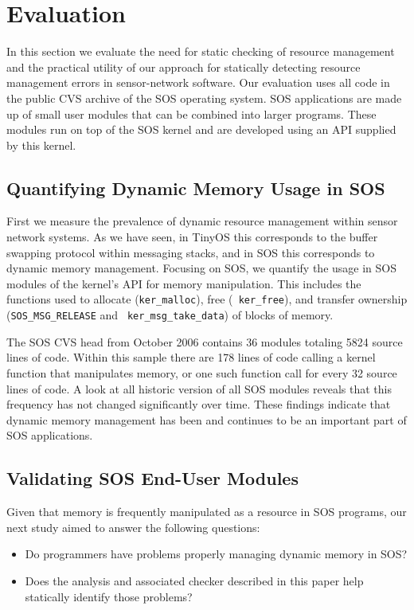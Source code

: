 \section{Evaluation}
\label{sec:eval}

In this section we evaluate the need for static checking of resource
management and the practical utility of our
approach for statically detecting resource management errors in
sensor-network software.  Our evaluation uses all code in the
public CVS archive of the SOS operating system.
SOS applications are made up of small
user modules that can be combined into larger programs.  These modules
run on top of the SOS kernel and are developed using an API
supplied by this kernel.


\subsection{Quantifying Dynamic Memory Usage in SOS}

First we measure the prevalence of dynamic resource management within
sensor network systems.  As we have seen, in TinyOS this 
corresponds to the buffer swapping protocol
within messaging stacks, and in SOS
this corresponds to dynamic memory management.
Focusing on SOS, we quantify the usage in SOS modules of the kernel's API for
memory manipulation.
This includes the 
functions used to allocate ({\tt ker\_malloc}), free ({\tt
  ker\_free}), 
and transfer ownership ({\tt SOS\_MSG\_RELEASE} and {\tt
  ker\_msg\_take\_data}) of blocks
of memory.


The SOS CVS head from October 2006 contains 36 modules totaling 5824 source 
lines of code.  Within this sample there are 178 lines of code
calling a kernel function that manipulates memory, or one such function call
for every 32 source lines of code.  A look at all historic version of all
SOS modules reveals that this frequency has not changed significantly
over time.  These findings indicate that dynamic memory management has been
and continues to be an important part of SOS applications.


\subsection{Validating SOS End-User Modules}

Given that
memory is frequently manipulated as a resource in SOS programs, our
next study aimed to answer the following questions:
%
\begin{itemize}
%
\item Do programmers have problems properly managing dynamic memory in SOS?
%
\item Does the analysis and associated checker described in this paper
  help statically identify
those problems?
%
\end{itemize}

